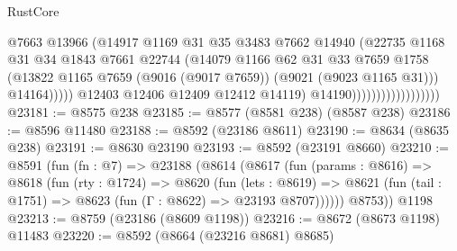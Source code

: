 \begin{lexlean}{RustCore}
\begin{coremodule}
                                              @7663
                                              @13966
                                              (@14917
                                                @1169
                                                @31
                                                @35
                                                @3483
                                                @7662
                                                @14940
                                                (@22735
                                                  @1168
                                                  @31
                                                  @34
                                                  @1843
                                                  @7661
                                                  @22744
                                                  (@14079
                                                    @1166
                                                    @62
                                                    @31
                                                    @33
                                                    @7659
                                                    @1758
                                                    (@13822
                                                      @1165
                                                      @7659
                                                      (@9016 (@9017 @7659))
                                                      (@9021 (@9023 @1165 @31)))
                                                    @14164)))))
                                          @12403
                                          @12406
                                          @12409
                                          @12412
                                          @14119)
                                        @14190))))))))))))))))))
@23181 := @8575 @238
@23185 := @8577 (@8581 @238) (@8587 @238)
@23186 := @8596 @11480
@23188 := @8592 (@23186 @8611)
@23190 := @8634 (@8635 @238)
@23191 := @8630 @23190
@23193 := @8592 (@23191 @8660)
@23210 := @8591
    (fun (fn : @7) =>
    @23188
      (@8614
        (@8617
          (fun (params : @8616) =>
          @8618
            (fun (rty : @1724) =>
            @8620
              (fun (lets : @8619) =>
              @8621 (fun (tail : @1751) => @8623 (fun (Γ : @8622) => @23193 @8707))))))
        @8753))
    @1198
@23213 := @8759 (@23186 (@8609 @1198))
@23216 := @8672 (@8673 @1198) @11483
@23220 := @8592 (@8664 (@23216 @8681) @8685)

\end{coremodule}
\end{lexlean}
